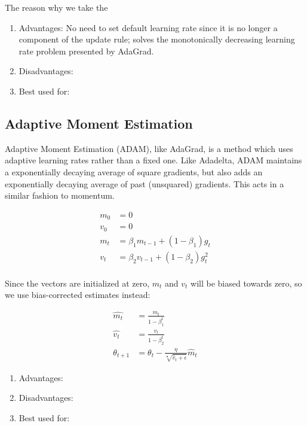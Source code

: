 \documentclass[twoside,11pt]{homework}
\begin{document}
The reason why we take the 
\begin{enumerate}
	\item Advantages: No need to set default learning rate since it is no longer a component of the update rule; solves the monotonically decreasing learning rate problem presented by AdaGrad.
	\item Disadvantages:
	\item Best used for:
\end{enumerate}
\subsection*{Adaptive Moment Estimation}
Adaptive Moment Estimation (ADAM), like AdaGrad, is a method which uses adaptive learning rates rather than a fixed one. Like Adadelta, ADAM maintains a exponentially decaying average of square gradients, but also adds an exponentially decaying average of past (unsquared) gradients. This acts in a similar fashion to momentum.

\begin{align*}
	m_0 &= 0\\
	v_0 &= 0\\
	m_t &= \beta_1 m_{t-1}+(1-\beta_1)g_t\\
	v_t &= \beta_2 v_{t-1}+(1-\beta_2)g^2_t\\
\end{align*} 

Since the vectors are initialized at zero, $m_t$ and $v_t$ will be biased towards zero, so we use bias-corrected estimates instead:

\begin{align*}
	\hat{m_t} &= \frac{m_t}{1-\beta^t_1}\\
	\hat{v_t} &= \frac{v_t}{1-\beta^t_2}\\
	\theta_{t+1} &= \theta_t - \frac{\eta}{\sqrt[•]{\hat{v}_t+\epsilon}}\hat{m}_t
\end{align*}

\begin{enumerate}
	\item Advantages:
	\item Disadvantages:
	\item Best used for:
\end{enumerate}
\end{document}
